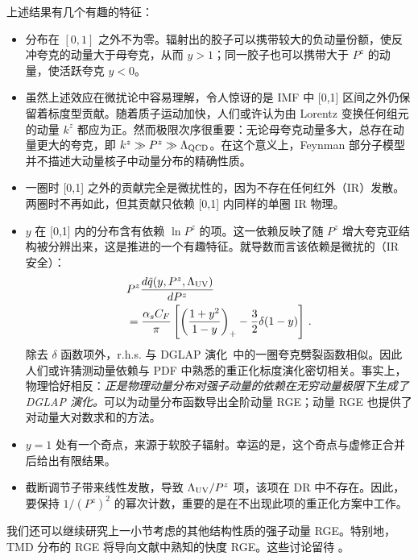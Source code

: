 上述结果有几个有趣的特征：
\begin{itemize}
	\item{分布在 {$[0,1]$} 之外不为零。辐射出的胶子可以携带较大的负动量份额，使反冲夸克的动量大于母夸克，从而 $y>1$；同一胶子也可以携带大于 $P^z$ 的动量，使活跃夸克 $y<0$。}

	\item{虽然上述效应在微扰论中容易理解，令人惊讶的是 IMF 中 [0,1] 区间之外仍保留着标度型贡献。随着质子运动加快，人们或许认为由 Lorentz 变换任何组元的动量 $k^z$ 都应为正。然而极限次序很重要：无论母夸克动量多大，总存在动量更大的夸克，即 $k^z\gg P^z \gg \Lambda_{\rm QCD}$。在这个意义上，Feynman 部分子模型并不描述大动量核子中动量分布的精确性质。}

	\item{一圈时 [0,1] 之外的贡献完全是微扰性的，因为不存在任何红外（IR）发散。两圈时不再如此，但其贡献只依赖 [0,1] 内同样的单圈 IR 物理。}

	\item{$y$ 在 [0,1] 内的分布含有依赖 $\ln P^z$ 的项。这一依赖反映了随 $P^z$ 增大夸克亚结构被分辨出来，这是推进的一个有趣特征。就导数而言该依赖是微扰的（IR 安全）：
		\begin{align}
			& P^z \frac{d \tilde q(y,P^z,\Lambda_{\rm UV})}{dP^z} \nonumber \\
			&= \frac{\alpha_s C_F}{\pi} \left[\left(\frac{1+y^2}{1-y}\right)_+ -\frac{3}{2}\delta(1-y) \right] \,.
		\end{align}
		除去 {$\delta$ 函数项}外，{r.h.s.} 与 DGLAP 演化~\cite{Dokshitzer:1977sg,Gribov:1972ri,Altarelli:1977zs}中的一圈夸克劈裂函数相似。因此人们或许猜测动量依赖与 PDF 中熟悉的重正化标度演化密切相关。事实上，物理恰好相反：{\it 正是物理动量分布对强子动量的依赖在无穷动量极限下生成了 DGLAP 演化。}可以为动量分布函数导出全阶动量 RGE；动量 RGE 也提供了对动量大对数求和的方法。}

	\item{$y=1$ 处有一个奇点，来源于软胶子辐射。幸运的是，这个奇点与虚修正合并后给出有限结果。}

	\item{截断调节子带来线性发散，导致 $\Lambda_{\rm UV}/P^z$ 项，该项在 DR 中不存在。因此，要保持 $1/(P^z)^2$ 的幂次计数，重要的是在不出现此项的重正化方案中工作。}

\end{itemize}

我们还可以继续研究上一小节考虑的其他结构性质的强子动量 RGE。特别地，TMD 分布的 RGE 将导向文献中熟知的快度 RGE。这些讨论留待 。

